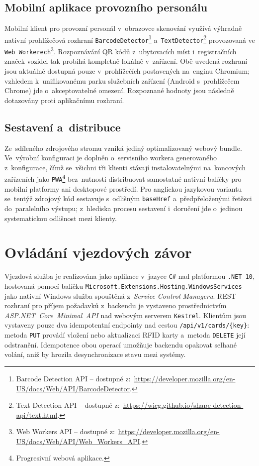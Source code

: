 \subsection{Mobilní aplikace provozního personálu}
\label{subsec:impl-clients-mobile}
Mobilní klient pro provozní personál v~obrazovce skenování využívá výhradně nativní prohlížečová rozhraní \texttt{BarcodeDetector}\footnote{Barcode Detection API -- dostupné z:~\url{https://developer.mozilla.org/en-US/docs/Web/API/BarcodeDetector}.} a~\texttt{TextDetector}\footnote{Text Detection API -- dostupné z:~\url{https://wicg.github.io/shape-detection-api/text.html}.} provozovaná ve \texttt{Web Workerech}\footnote{Web Workers API -- dostupné z:~\url{https://developer.mozilla.org/en-US/docs/Web/API/Web_Workers_API}.}.
Rozpoznávání QR kódů z~ubytovacích míst i~registračních značek vozidel tak probíhá kompletně lokálně v~zařízení.
Obě uvedená rozhraní jsou aktuálně dostupná pouze v~prohlížečích postavených na~enginu Chromium; vzhledem k~unifikovanému parku služebních zařízení (Android s~prohlížečem Chrome) jde o~akceptovatelné omezení.
Rozpoznané hodnoty jsou následně dotazovány proti aplikačnímu rozhraní.

\subsection{Sestavení a~distribuce}
\label{subsec:impl-clients-build}
Ze~sdíleného zdrojového stromu vzniká jediný optimalizovaný webový bundle.
Ve~výrobní konfiguraci je doplněn o~servisního workera generovaného z~konfigurace, čímž se~všichni tři klienti stávají instalovatelnými na~koncových zařízeních jako \texttt{PWA}\footnote{Progresivní webová aplikace.} bez~nutnosti distribuovat samostatné nativní balíčky pro mobilní platformy ani desktopové prostředí.
Pro anglickou jazykovou variantu se~tentýž zdrojový kód sestavuje s~odlišným \texttt{baseHref} a~předpřeloženými řetězci do~paralelního výstupu; z~hlediska procesu sestavení i~doručení jde o~jedinou systematickou odlišnost mezi klienty.

\section{Ovládání vjezdových závor}
\label{sec:impl-gate}
Vjezdová služba je realizována jako aplikace v~jazyce \texttt{C\#} nad platformou \texttt{.NET~10}, hostovaná pomocí balíčku \texttt{Microsoft.Extensions.Hosting.WindowsServices} jako nativní Windows služba spouštěná z~\emph{Service Control Manageru}.
REST rozhraní pro příjem požadavků z~backendu je vystaveno prostřednictvím \emph{ASP.NET~Core~Minimal~API} nad webovým serverem \texttt{Kestrel}.
Klientům jsou vystaveny pouze dva idempotentní endpointy nad cestou \texttt{/api/v1/cards/\{key\}}: metoda \texttt{PUT} provádí vložení nebo aktualizaci RFID karty a~metoda \texttt{DELETE} její odstranění.
Idempotence obou operací umožňuje backendu opakovat selhané volání, aniž by hrozila desynchronizace stavu mezi systémy.


